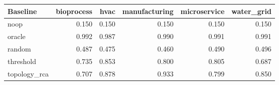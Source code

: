 \begin{tabular}{lrrrrr}
\toprule
Baseline & bioprocess & hvac & manufacturing & microservice & water\_grid \\
\midrule
noop & 0.150 & 0.150 & 0.150 & 0.150 & 0.150 \\
oracle & 0.992 & 0.987 & 0.990 & 0.991 & 0.991 \\
random & 0.487 & 0.475 & 0.460 & 0.490 & 0.496 \\
threshold & 0.735 & 0.853 & 0.800 & 0.805 & 0.687 \\
topology\_rca & 0.707 & 0.878 & 0.933 & 0.799 & 0.850 \\
\bottomrule
\end{tabular}
